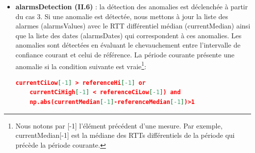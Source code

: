\begin{itemize}
\begin{enumerate}
\begin{itemize}
			\item  Soit \textit{aggr\_median} la médiane de tous les RTTs différentiels médians de référence calculés pour toutes les périodes précédentes. 
			
			\item 	Soit \textit{aggr\_ciLow} la médiane de     toutes les bornes inférieures calculées pendant les périodes précédentes.
			
			\item 	Soit \textit{aggr\_ciHigh} la médiane de     toutes les bornes inférieures calculées pendant les périodes précédentes.
			
		\end{itemize}
		
		
		\item \underline{Cas $3$} : une fois la référence est assez représentable, nous mettons à jour cette dernière comme suit \footnote{Nous précisons que $ var[-1] $ dénote la dernière valeur que $ var $  avait. }:
\begin{align*}
referenceMedian &=  0.99*referenceMedian[-1]+0.01*currentMedian\\
referenceCiLow &=	 0.99*referenceLow[-1]+0.01*rttDiffL\\
referenceCiHigh &=  0.99*referenceHigh[-1]+0.01*rttDiffH
\end{align*}
		
		
Pour toute période, la mise à jour de la référence est effectuée selon un des trois cas. Nous précision que $ \alpha = 0.01 $.
		
	\end{enumerate}
	\item \textbf{ alarmsDetection (II.6) }:   la détection des anomalies est déclenchée à partir du cas $3$. Si une anomalie est détectée, nous mettons à jour la liste des alarmes  {\color{gray}(alarmsValues)} avec le RTT différentiel médian (currentMedian) ainsi que la
	liste des dates  {\color{gray}(alarmsDates)} qui correspondent à ces anomalies. Les anomalies sont détectées en évaluant le chevauchement entre l'intervalle de confiance courant et celui de référence. La période courante présente une anomalie si la condition suivante est vraie\footnote{Nous notons par [-1] l'élément précédent d'une mesure. Par exemple, currentMedian[-1] est la médiane des RTTs différentiels de la période qui précède la période courante.}:
	\begin{lstlisting}[language=json,firstnumber=1, caption={Conditions de présence d'une anomalie pour un lien},
	basicstyle =\footnotesize]
	currentCiLow[-1] > referenceHi[-1] or
	currentCiHigh[-1] < referenceCiLow[-1]) and
	np.abs(currentMedian[-1]-referenceMedian[-1])>1
	\end{lstlisting}
	
	
	
\end{itemize}

